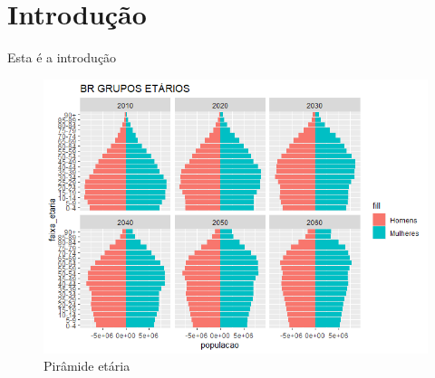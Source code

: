 \documentclass[12pt,openright,twoside,a4paper,brazil]{abntex2}
\begin{document}
\imprimirfolhaderosto

\textual
\chapter{Introdução}
Esta é a introdução

\begin{figure}
  \caption{Pirâmide etária}
  \includegraphics{plot-1.png}
\end{figure}
\end{document}
